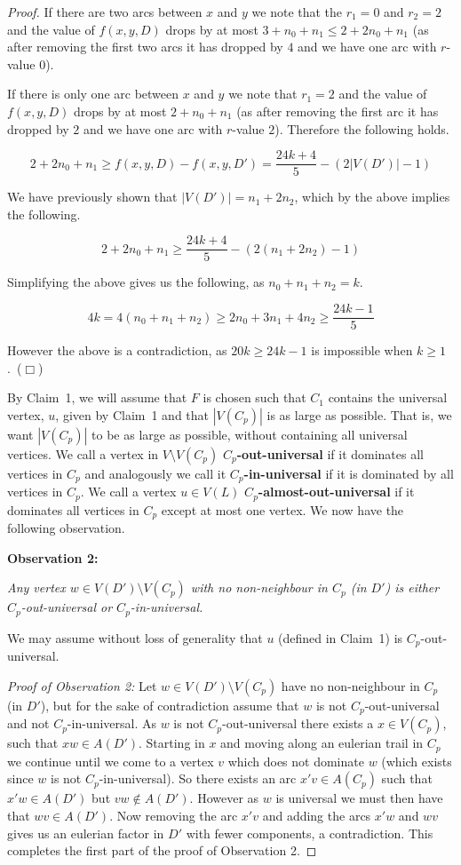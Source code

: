 \documentclass{article}
\newcommand{\smallqed}{\hfill {\tiny ($\Box$)}}
\newcommand{\2}{\vspace{2mm}}
\theoremstyle{plain}
\theoremstyle{definition}
\begin{document}
\begin{proof}
If there are two arcs between $x$ and $y$ we note that the $r_1=0$ and $r_2=2$ and the
value of $f(x,y,D)$ drops by at most $3+n_0+n_1\leq 2 + 2n_0 + n_1$ (as after removing the first two arcs it has dropped by
$4$ and we have one arc with $r$-value $0$).

If there is only one arc between $x$ and $y$ we note that $r_1=2$  and the
value of $f(x,y,D)$ drops by at most $2 + n_0 + n_1$ (as after removing the first arc it has dropped by
$2$ and we have one arc with $r$-value $2$).
Therefore the following holds.

\[
2 + 2n_0 + n_1 \geq f(x,y,D) - f(x,y,D') = \frac{24k+4}{5} - (2|V(D')|-1)
\]

We have previously shown that $|V(D')| = n_1 + 2n_2$, which by the above implies the following.

\[
2 + 2n_0 + n_1 \geq \frac{24k+4}{5} - (2(n_1+2n_2)-1)
\]

Simplifying the above gives us the following, as $n_0+n_1+n_2 = k$.


\[
4k = 4(n_0+n_1+n_2) \geq  2n_0 + 3n_1 + 4n_2  \geq \frac{24k-1}{5} 
\]

However the above is a contradiction, as $20 k \geq 24k-1$ is impossible when $k \geq 1$.~\smallqed{}

\2

By Claim~1, we will assume that $F$ is chosen such that $C_1$ contains the universal vertex, $u$, given by Claim~1 and
that $|V(C_p)|$ is as large as possible. That is, we want $|V(C_p)|$ to be as large as possible, without containing all
universal vertices.
We call a vertex in $V\setminus V(C_p)$ {\bf $C_p$-out-universal} if it dominates all vertices in $C_p$ and analogously we call
it {\bf $C_p$-in-universal} if it is dominated by all vertices in $C_p$.
We call a vertex $u \in V(L)$ {\bf $C_p$-almost-out-universal} if it dominates all vertices in $C_p$ except at most  one vertex.
We now have the following observation.

\2

{\bf Observation 2:} {\em Any vertex $w \in V(D') \setminus V(C_p)$ with no non-neighbour in $C_p$ (in $D'$) is
either $C_p$-out-universal or $C_p$-in-universal.

We may assume without loss of generality that $u$ (defined in Claim~1) is $C_p$-out-universal.}

\2

{\em Proof of Observation 2:} Let $w \in V(D') \setminus V(C_p)$ have no non-neighbour in $C_p$ (in $D'$),
but for the sake of contradiction assume that $w$ is not $C_p$-out-universal and not $C_p$-in-universal.
As $w$ is not $C_p$-out-universal there exists a $x \in V(C_p)$, such that  $xw \in A(D')$.
Starting in $x$ and moving along an eulerian trail in $C_p$ we continue until we come to a vertex $v$ which 
does not dominate $w$ (which exists since $w$ is not $C_p$-in-universal). So there exists an arc $x'v \in A(C_p)$ such that
$x'w \in A(D')$ but $vw \not\in A(D')$. However as $w$ is universal we must then have that $wv \in A(D')$.
Now removing the arc $x'v$ and adding the arcs $x'w$ and $wv$ gives us an eulerian factor in $D'$ with fewer 
components, a contradiction. This completes the first part of the proof of Observation 2.


\end{proof}
\end{document}
